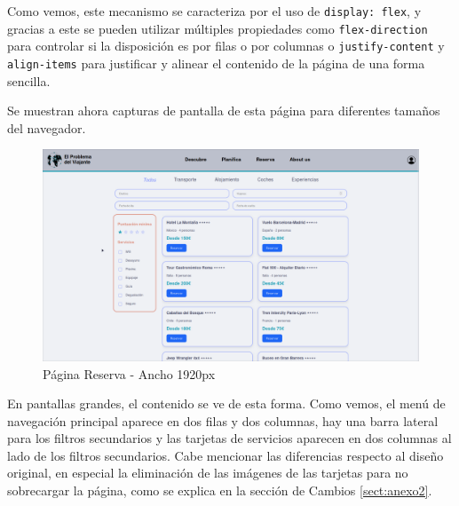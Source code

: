 \documentclass[11pt, a4paper]{book}
\begin{document}
    Como vemos, este mecanismo se caracteriza por el uso de \texttt{display: flex}, y gracias a este se pueden utilizar múltiples propiedades como \texttt{flex-direction} para controlar si la disposición es por filas o por columnas o \texttt{justify-content} y \texttt{align-items} para justificar y alinear el contenido de la página de una forma sencilla.

    Se muestran ahora capturas de pantalla de esta página para diferentes tamaños del navegador.
    

	\begin{figure} [H]
		\centering
		\includegraphics[width=\textwidth]{CSS/5-1 1920.png}
		\caption{Página Reserva - Ancho 1920px}
	\end{figure}

    En pantallas grandes, el contenido se ve de esta forma. Como vemos, el menú de navegación principal aparece en dos filas y dos columnas, hay una barra lateral para los filtros secundarios y las tarjetas de servicios aparecen en dos columnas al lado de los filtros secundarios. Cabe mencionar las diferencias respecto al diseño original, en especial la eliminación de las imágenes de las tarjetas para no sobrecargar la página, como se explica en la sección de Cambios \ref{sect:anexo2}.
\end{document}
